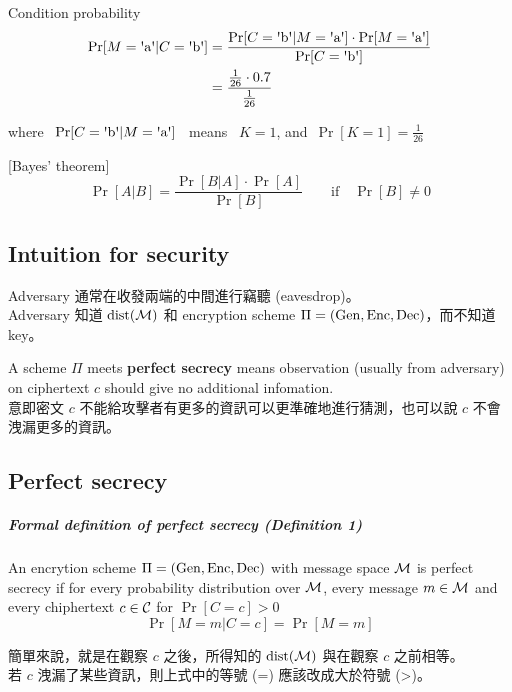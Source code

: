 Condition probability
\begin{align*}
	\Pr[M = \text{\textquotesingle{}a\textquotesingle} | C =  \text{\textquotesingle{}b\textquotesingle}] &=
	\frac{
		\Pr[C = \text{\textquotesingle{}b\textquotesingle} | M = \text{\textquotesingle{}a\textquotesingle}] \cdot \Pr[M = \text{\textquotesingle{}a\textquotesingle}]
	}
	{\Pr[C = \text{\textquotesingle{}b\textquotesingle}]} \\
	&= \frac{\frac{1}{26} \cdot 0.7}{\frac{1}{26}}
\end{align*}

where \, \(\Pr[C = \text{\textquotesingle{}b\textquotesingle} | M = \text{\textquotesingle{}a\textquotesingle}]\) \, means \, \(K = 1\), and\, \(\Pr[K = 1] = \frac{1}{26}\)

[Bayes' theorem]
\[\Pr[A|B] = \frac{\Pr[B|A] \cdot \Pr[A]}{\Pr[B]} \qquad \text{if} \quad \Pr[B] \neq 0\]


\subsection{Intuition for security}

Adversary 通常在收發兩端的中間進行竊聽 (eavesdrop)。 \\
Adversary 知道 \(\operatorname{dist}(\operatorname{\mathcal{M}})\) 和 encryption scheme \(\Pi = (\operatorname{Gen}, \operatorname{Enc}, \operatorname{Dec})\)，而不知道 key。

A scheme \(\Pi\) meets \textbf{perfect secrecy} means observation (usually from adversary) on ciphertext \(c\) should give no additional infomation. \\
意即密文 \(c\) 不能給攻擊者有更多的資訊可以更準確地進行猜測，也可以說 \(c\) 不會洩漏更多的資訊。


\subsection{Perfect secrecy}

\subparagraph{Formal definition of perfect secrecy (\textbf{Definition 1})}

An encrytion scheme \(\Pi = (\operatorname{Gen}, \operatorname{Enc}, \operatorname{Dec})\) with message space \(\operatorname{\mathcal{M}}\) is perfect secrecy if for every probability distribution over \(\operatorname{\mathcal{M}}\), every message \(m \in \operatorname{\mathcal{M}}\) and every chiphertext \(c \in \operatorname{\mathcal{C}}\) for \(\Pr[C = c] > 0\)
\[\Pr[M = m | C = c] = \Pr[M = m]\]

簡單來說，就是在觀察 \(c\) 之後，所得知的 \(\operatorname{dist}(\operatorname{\mathcal{M}})\) 與在觀察 \(c\) 之前相等。 \\
若 \(c\) 洩漏了某些資訊，則上式中的等號 (=) 應該改成大於符號 (>)。


